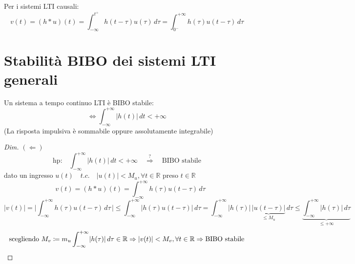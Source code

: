 Per i sistemi LTI causali:
\[
	v(t)=(h*u)(t) = \int_{-\infty}^{t^+}h(t-\tau)u(\tau)\,d\tau = \int_{0^-}^{+\infty}h(\tau)u(t-\tau)\,d\tau
\]


\section{Stabilità BIBO dei sistemi LTI generali}
\label{sec:BIBO}




Un sistema a tempo continuo LTI è BIBO stabile:
\[
	\Leftrightarrow \int_{-\infty}^{+\infty}\lvert h(t) \rvert \,dt < +\infty
\]
(La risposta impulsiva è sommabile oppure assolutamente integrabile)

\begin{proof}[Dim]
	\emph{$(\Leftarrow)$}
	\[
		\text{hp:} \quad \int_{-\infty}^{+\infty}\lvert h(t) \rvert \,dt < +\infty \quad \overset{?}{\Rightarrow} \quad \text{BIBO stabile}
	\]	
	dato un ingresso $u(t) \quad t.c.\quad \lvert u(t) \rvert < M_u , \forall t \in \mathbb{R}$ preso $t \in \mathbb{R}$ 
	\[
		\quad v(t)=(h*u)(t) = \int_{-\infty}^{+\infty}h(\tau)u(t-\tau)\,d\tau 
	\]
	\[
		\lvert v(t) \rvert 
		= \bigg\lvert \int_{-\infty}^{+\infty}h(\tau)u(t-\tau)\,d\tau \,  \bigg\rvert
		\le \int_{-\infty}^{+\infty} \rvert h(\tau)u(t-\tau) \lvert\,d\tau
		= \int_{-\infty}^{+\infty} \rvert h(\tau) \lvert \, \underbrace{\rvert u(t-\tau) \lvert}_{\le M_u} \,d\tau
		\le \underbrace{\int_{-\infty}^{+\infty} \rvert h(\tau)\lvert\,d\tau}_{\le + \infty}
	\]
	\[
		\text{scegliendo } M_v \coloneqq m_u \int_{-\infty}^{+\infty} \rvert h(\tau)\lvert\,d\tau \in \mathbb{R} \Rightarrow \lvert v(t) \rvert < M_v, \forall t \in \mathbb{R}\Rightarrow \text{BIBO stabile} \qedhere
	\]
\end{proof}

